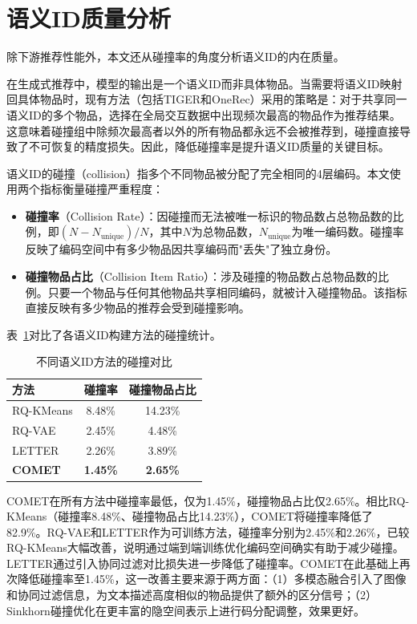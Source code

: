 \section{语义ID质量分析}

除下游推荐性能外，本文还从碰撞率的角度分析语义ID的内在质量。

在生成式推荐中，模型的输出是一个语义ID而非具体物品。当需要将语义ID映射回具体物品时，现有方法（包括TIGER和OneRec）采用的策略是：对于共享同一语义ID的多个物品，选择在全局交互数据中出现频次最高的物品作为推荐结果。这意味着碰撞组中除频次最高者以外的所有物品都永远不会被推荐到，碰撞直接导致了不可恢复的精度损失。因此，降低碰撞率是提升语义ID质量的关键目标。

语义ID的碰撞（collision）指多个不同物品被分配了完全相同的4层编码。本文使用两个指标衡量碰撞严重程度：

\begin{itemize}
  \item \textbf{碰撞率}（Collision Rate）：因碰撞而无法被唯一标识的物品数占总物品数的比例，即$(N - N_{\text{unique}}) / N$，其中$N$为总物品数，$N_{\text{unique}}$为唯一编码数。碰撞率反映了编码空间中有多少物品因共享编码而"丢失"了独立身份。
  \item \textbf{碰撞物品占比}（Collision Item Ratio）：涉及碰撞的物品数占总物品数的比例。只要一个物品与任何其他物品共享相同编码，就被计入碰撞物品。该指标直接反映有多少物品的推荐会受到碰撞影响。
\end{itemize}

表~\ref{tab:collision}对比了各语义ID构建方法的碰撞统计。

\begin{table}[htbp]
  \centering
  \caption{不同语义ID方法的碰撞对比}
  \label{tab:collision}
  \begin{tabular}{lcc}
    \toprule
    方法 & 碰撞率 & 碰撞物品占比 \\
    \midrule
    RQ-KMeans\cite{onerec} & 8.48\% & 14.23\% \\
    RQ-VAE\cite{lee2022autoregressive} & 2.45\% & 4.48\% \\
    LETTER\cite{wang2024learnable} & 2.26\% & 3.89\% \\
    \textbf{COMET} & \textbf{1.45\%} & \textbf{2.65\%} \\
    \bottomrule
  \end{tabular}
\end{table}

COMET在所有方法中碰撞率最低，仅为1.45\%，碰撞物品占比仅2.65\%。相比RQ-KMeans（碰撞率8.48\%、碰撞物品占比14.23\%），COMET将碰撞率降低了82.9\%。RQ-VAE和LETTER作为可训练方法，碰撞率分别为2.45\%和2.26\%，已较RQ-KMeans大幅改善，说明通过端到端训练优化编码空间确实有助于减少碰撞。LETTER通过引入协同过滤对比损失进一步降低了碰撞率。COMET在此基础上再次降低碰撞率至1.45\%，这一改善主要来源于两方面：（1）多模态融合引入了图像和协同过滤信息，为文本描述高度相似的物品提供了额外的区分信号；（2）Sinkhorn碰撞优化在更丰富的隐空间表示上进行码分配调整，效果更好。


